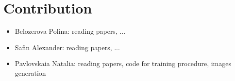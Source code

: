 \documentclass[a4paper, 11pt]{article}
\begin{document}
    \section*{Contribution}
    \begin{itemize}
        \item {Belozerova Polina: reading papers, ...}
        \item {Safin Alexander: reading papers, ...}
        \item {Pavlovskaia Natalia: reading papers, code for training procedure, images generation}
    \end{itemize}

    \nocite{*} %
    
\end{document}
